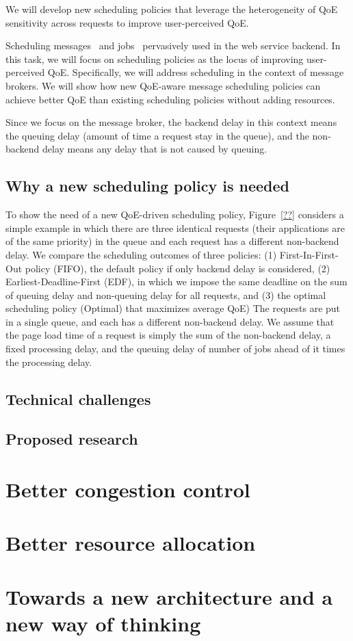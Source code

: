 \begin{task}
We will develop new scheduling policies that leverage the heterogeneity of QoE sensitivity across requests to improve user-perceived QoE.
\end{task}

Scheduling messages~\cite{??} and jobs~\cite{??} pervasively used in the web service backend. 
In this task, we will focus on scheduling policies as the locus of improving user-perceived QoE.
Specifically, we will address scheduling in the context of message brokers.
We will show how new QoE-aware message scheduling policies can achieve better QoE than existing scheduling policies without adding resources.

Since we focus on the message broker, the backend delay in this context means the queuing delay (amount of time a request stay in the queue), and the non-backend delay means any delay that is not caused by queuing.

\subsection{Why a new scheduling policy is needed}

To show the need of a new QoE-driven scheduling policy, Figure~\ref{??} considers a simple example in which there are three identical requests (\ie their applications are of the same priority) in the queue and each request has a different non-backend delay.
We compare the scheduling outcomes of three policies: 
(1) First-In-First-Out policy (FIFO), \ie the default policy if only backend delay is considered,
(2) Earliest-Deadline-First (EDF), \ie in which we impose the same deadline on the sum of queuing delay and non-queuing delay for all requests, and 
(3) the optimal scheduling policy (Optimal) that maximizes average QoE)
The requests are put in a single queue, and each has a different non-backend delay.
We assume that the page load time of a request is simply the sum of the non-backend delay, a fixed processing delay, and the queuing delay of number of jobs ahead of it times the processing delay.

\subsection{Technical challenges}

\subsection{Proposed research}



\section{Better congestion control}

\section{Better resource allocation}

\section{Towards a new architecture and a new way of thinking}
\label{sec:arch}



